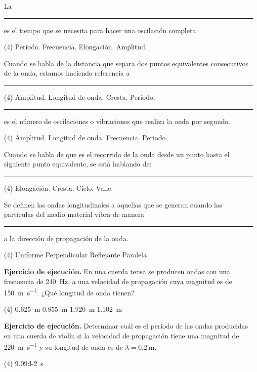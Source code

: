 \documentclass[12pt, letter]{exam}
\begin{document}
\begin{questions}
    \question La \rule{2cm}{0.3mm} es el tiempo que se necesita para hacer una oscilación completa.
    \begin{tasks}(4)
        \task Periodo.
        \task Frecuencia.
        \task Elongación.
        \task Amplitud.
    \end{tasks}
    \question Cuando se habla de la distancia que separa dos puntos equivalentes consecutivos de la onda, estamos haciendo referencia a \rule{2cm}{0.3mm} 
    \begin{tasks}(4)
        \task Amplitud.
        \task Longitud de onda.
        \task Cresta.
        \task Periodo.
    \end{tasks}
    \question \rule{2cm}{0.3mm} es el número de oscilaciones o vibraciones que realiza la onda por segundo.
    \begin{tasks}(4)
        \task Amplitud.
        \task Longitud de onda.
        \task Frecuencia.
        \task Periodo.
    \end{tasks}
    \question Cuando se habla de que es el recorrido de la onda desde un punto hasta el siguiente punto equivalente, se está hablando de: \rule{1.5cm}{0.3mm}
    \begin{tasks}(4)
        \task Elongación.
        \task Cresta.
        \task Ciclo.
        \task Valle.
    \end{tasks}
    \question Se definen las ondas longitudinales a aquellas que se generan cuando las partículas del medio material vibra de manera \rule{2cm}{0.3mm} a la dirección de propagación de la onda.
    \begin{tasks}(4)
        \task Uniforme
        \task Perpendicular
        \task Reflejante
        \task Paralela
    \end{tasks}
    \question \textbf{Ejercicio de ejecución.} En una cuerda tensa se producen ondas con una frecuencia de \SI{240}{\hertz}, a una velocidad de propagación cuya magnitud es de \SI{150}{\meter\per\second}. ¿Qué longitud de onda tienen?
    \begin{tasks}(4)
       \task \SI{0.625}{\meter}
       \task \SI{0.855}{\meter}
       \task \SI{1.920}{\meter}
       \task \SI{1.102}{\meter}
   \end{tasks}
    \question \textbf{Ejercicio de ejecución.} Determinar cuál es el periodo de las ondas producidas en una cuerda de violín si la velocidad de propagación tiene una magnitud de \SI{220}{\meter\per\second} y su longitud de onda es de $\lambda = \SI{0.2}{\meter}$.
    \begin{tasks}(4)
       \task \SI{9.09d-2}{\second}

\end{tasks}
\end{questions}
\end{document}

